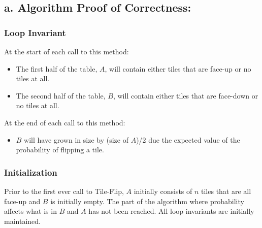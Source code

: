 \documentclass[12pt]{article}
\begin{document}
\subsection*{a. Algorithm Proof of Correctness: }
\subsubsection*{Loop Invariant}
At the start of each call to this method:
\begin{itemize}
\item The first half of the table, $A$, will contain either tiles that are face-up or no tiles at all.
\item The second half of the table, $B$, will contain either tiles that are face-down or no tiles at all.
\end{itemize}
At the end of each call to this method:
\begin{itemize}
\item $B$ will have grown in size by (size of $A$)/2 due the expected value of the probability of flipping a tile.
\end{itemize}
\subsubsection*{Initialization}
Prior to the first ever call to Tile-Flip, $A$ initially consists of $n$ tiles that are all face-up and $B$ is initially empty.  The part of the algorithm where probability affects what is in $B$ and $A$ has
not been reached.  All loop invariants are initially maintained.\\  
\end{document}
